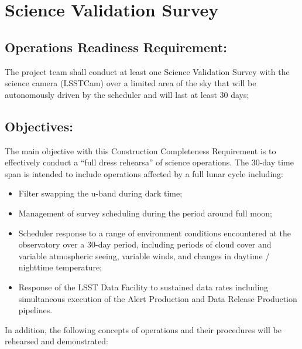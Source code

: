 \section{Science Validation Survey}  \label{sec:svs}

\subsection{Operations Readiness Requirement:}

The project team shall conduct at least one Science Validation Survey with the science camera (LSSTCam) over a limited area of the sky that will be autonomously driven by the scheduler and will last at least 30 days;

\subsection{Objectives:}

The main objective with this Construction Completeness Requirement is to effectively conduct a ``full dress rehearsa'' of science operations. The 30-day time span is intended to include operations affected by a full lunar cycle including:

\begin{itemize}
\item Filter swapping the u-band during dark time;
\item Management of survey scheduling during the period around full moon;
\item Scheduler response to a range of environment conditions encountered at the observatory over a 30-day period, including periods of cloud cover and variable atmospheric seeing, variable winds, and changes in daytime / nighttime temperature;
\item Response of the LSST Data Facility to sustained data rates including simultaneous execution of the Alert Production and Data Release Production pipelines.
\end{itemize}

In addition, the following concepts of operations and their procedures will be rehearsed and demonstrated:

